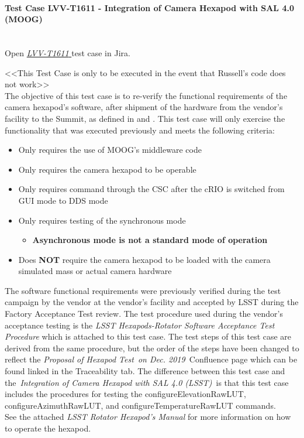 \documentclass[SE,lsstdraft,STR,toc]{lsstdoc}
\providecommand{\tightlist}{
  \setlength{\itemsep}{0pt}\setlength{\parskip}{0pt}}
\begin{document}
\paragraph{Test Case LVV-T1611 - Integration of Camera Hexapod with SAL 4.0 (MOOG)
 }\mbox{}\\

Open  \href{https://jira.lsstcorp.org/secure/Tests.jspa#/testCase/LVV-T1611}{\textit{ LVV-T1611 } }
test case in Jira.

{\textless{}\textless{}This Test Case is only to be executed in the
event that Russell's code does not work\textgreater{}\textgreater{}}\\
The objective of this test case is to re-verify the functional
requirements of the camera hexapod's software, after shipment of the
hardware from the vendor's facility to the Summit, as defined in 
and . This test case will only exercise the functionality that
was executed previously and meets the following criteria:

\begin{itemize}
\tightlist
\item
  Only requires the use of MOOG's middleware code
\item
  Only requires the camera hexapod to be operable
\item
  Only requires command through the CSC after the cRIO is switched from
  GUI mode to DDS mode
\item
  Only requires testing of the synchronous mode

  \begin{itemize}
  \tightlist
  \item
    \textbf{Asynchronous mode is not a standard mode of operation}
  \end{itemize}
\item
  Does \textbf{NOT} require the camera hexapod to be loaded with the
  camera simulated mass or actual camera hardware
\end{itemize}

The software functional requirements were previously verified during the
test campaign by the vendor at the vendor's facility and accepted by
LSST during the Factory Acceptance Test review. The test procedure used
during the vendor's acceptance testing is the \emph{LSST
Hexapods-Rotator Software Acceptance Test Procedure} which is attached
to this test case. The test steps of this test case are derived from the
same procedure, but the order of the steps have been changed to reflect
the \emph{Proposal of Hexapod Test~on Dec. 2019~}Confluence page which
can be found linked in the Traceability tab. The difference between this
test case and the~\emph{Integration of Camera Hexapod with SAL 4.0
(LSST)~}is that this test case includes the procedures for testing the
configureElevationRawLUT, configureAzimuthRawLUT, and
configureTemperatureRawLUT commands.\\[2\baselineskip]See the attached
\emph{LSST Rotator Hexapod's Manual} for more information on how to
operate the hexapod.
\end{document}
